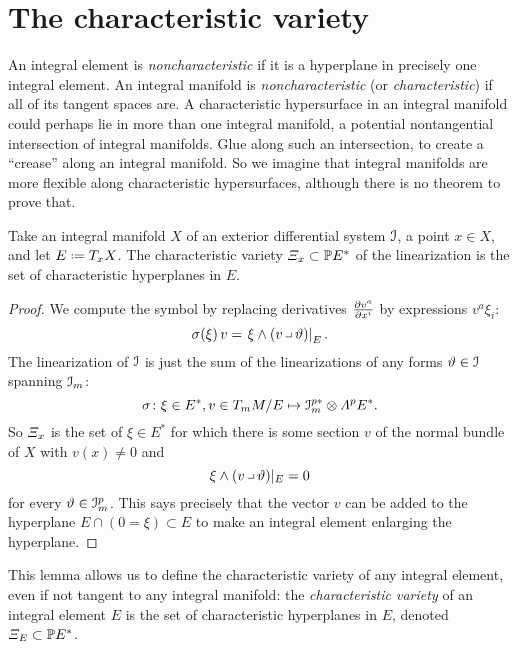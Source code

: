 \section{The characteristic variety}
An integral element is \emph{noncharacteristic} if it is a hyperplane in precisely one integral element.
An integral manifold is \emph{noncharacteristic} (or \emph{characteristic}) if all of its tangent spaces are.
A characteristic hypersurface in an integral manifold could perhaps lie in more than one integral manifold, a potential nontangential intersection of integral manifolds.
Glue along such an intersection, to create a ``crease'' along an integral manifold.
So we imagine that integral manifolds are more flexible along characteristic hypersurfaces, although there is no theorem to prove that.
\begin{lemma}\label{lemma:char.var}
Take an integral manifold \(X\) of an exterior differential system \(\mathcal{I}\), a point \(x \in X\), and let \(E\defeq T_x X\).
The characteristic variety 
\(
\CV_x \subset \Proj(E^*)
\)
of the linearization is the set of characteristic hyperplanes in \(E\).
\end{lemma}
\begin{proof}
We compute the symbol by replacing derivatives \(\pderiv{v^a}{x^i}\) by expressions \(v^a\xi_i\):
\[
\opsymbol[]{\xi}v = \left.\xi \wedge (v \hook \vartheta)\right|_E.
\]
The linearization of \(\mathcal{I}\) is just the sum of the linearizations of any forms \(\vartheta \in \mathcal{I}\) spanning \(\mathcal{I}_m\):
\[
\opsymbol{} \colon \xi \in E^*, v \in T_m M/E \mapsto \II_m^{p*} \otimes \Lm{p}{E}^*.
\]
So \(\CV_x\) is the set of \(\xi \in E^*\) for which there is some section \(v\) of the normal bundle of \(X\) with \(v(x)\ne 0\) and 
\[
\xi \wedge (v \hook \vartheta)|_E=0
\]
for every \(\vartheta \in \mathcal{I}^p_m\).
This says precisely that the vector \(v\) can be added to the hyperplane \(E\cap (0=\xi) \subset E\) to make an integral element enlarging the hyperplane.
\end{proof}
This lemma allows us to define the characteristic variety of any integral element, even if not tangent to any integral manifold: the \emph{characteristic variety} of an integral element \(E\) is the set of characteristic hyperplanes in \(E\), denoted \(\CV_E\subset \Proj(E^*)\).
